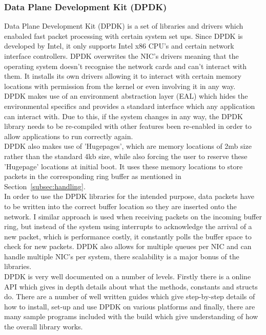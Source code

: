 \documentclass[interim_report.tex]{subfiles}
\begin{document}
\subsubsection{Data Plane Development Kit (DPDK)}
\label{subsec:dpdk}
Data Plane Development Kit (DPDK) \cite{dpdk} is a set of libraries and drivers which enabaled fast packet processing with certain system set ups. Since DPDK is developed by Intel, it only supports Intel x86 CPU's and certain network interface controllers. DPDK overwrites the NIC's drivers meaning that the operating system doesn't recognise the network cards and can't interact with them. It installs its own drivers allowing it to interact with certain memory locations with permission from the kernel or even involving it in any way. \\
\newline
DPDK makes use of an environment abstraction layer (EAL) which hides the environmental specifics and provides a standard interface which any application can interact with. Due to this, if the system changes in any way, the DPDK library needs to be re-compiled with other features been re-enabled in order to allow applications to run correctly again. \\
\newline
DPDK also makes use of 'Hugepages', which are memory locations of 2mb size rather than the standard 4kb size, while also forcing the user to reserve these 'Hugepage' locations at initial boot. It uses these memory locations to store packets in the corresponding ring buffer as mentioned in Section~\ref{subsec:handling}. \\
\newline
In order to use the DPDK libraries for the intended purpose, data packets have to be written into the correct buffer location so they are inserted onto the network. I similar approach is used when receiving packets on the incoming buffer ring, but instead of the system using interrupts to acknowledge the arrival of a new packet, which is performance costly, it constantly polls the buffer space to check for new packets. DPDK also allows for multiple queues per NIC and can handle multiple NIC's per system, there scalability is a major bonus of the libraries. \\
\newline
DPDK is very well documented on a number of levels. Firstly there is a online API which gives in depth details about what the methods, constants and structs do. There are a number of well written guides which give step-by-step details of how to install, set-up and use DPDK on various platforms and finally, there are many sample programs included with the build which give understanding of how the overall library works.
\end{document}
